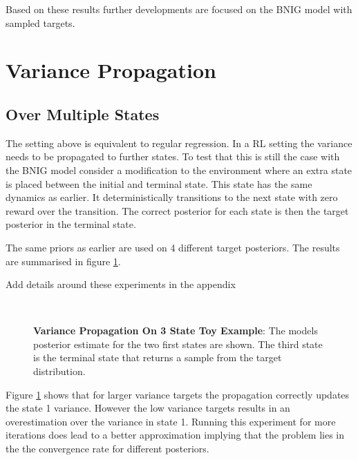 Based on these results further developments are focused on the BNIG model with sampled targets.

\section{Variance Propagation}

\subsection{Over Multiple States}

The setting above is equivalent to regular regression. In a RL setting the variance needs to be propagated to further states. To test that this is still the case with the BNIG model consider a modification to the environment where an extra state is placed between the initial and terminal state. This state has the same dynamics as earlier. It deterministically transitions to the next state with zero reward over the transition. The correct posterior for each state is then the target posterior in the terminal state. 

The same priors as earlier are used on 4 different target posteriors. The results are summarised in figure \ref{fig:3stateproptest}.

\todo Add details around these experiments in the appendix

\begin{figure}[H]
    \centering

    \\
    \caption{\textbf{Variance Propagation On 3 State Toy Example}: The models posterior estimate for the two first states are shown. The third state is the terminal state that returns a sample from the target distribution.}
    \label{fig:3stateproptest}
\end{figure}

Figure \ref{fig:3stateproptest} shows that for larger variance targets the propagation correctly updates the state 1 variance. However the low variance targets results in an overestimation over the variance in state 1. Running this experiment for more iterations does lead to a better approximation implying that the problem lies in the the convergence rate for different posteriors. 

